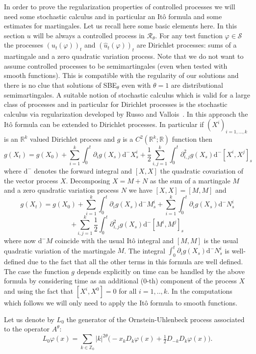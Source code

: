 \documentclass[11pt,a4paper,reqno]{amsart}
\newcommand{\RR}{\mathbb{R}}
\newcommand{\dd}{\mathrm{d}}
\newcommand{\cS}{\mathcal{S}}
\begin{document}
In order to prove the regularization properties of controlled processes we will need some stochastic calculus and in particular an It\^o formula and some estimates for martingales. Let us recall here some basic elements here. In this section $u$ will be always a controlled process in $\mathcal{R}_\theta$. 
For any test function $\varphi\in\cS$ the processes $(u_t(\varphi))_{t}$ and $(\hat u_t(\varphi))_{t}$ are Dirichlet processes: sums of a martingale and a zero quadratic variation process. 
Note that we do not want to assume controlled processes to be semimartingales (even when tested with smooth functions). This is compatible with the regularity of our solutions and there is no clue that solutions of  SBE$_\theta$ even with $\theta=1$ are distributional semimartingales. A suitable notion of stochastic calculus which is valid for a large class of processes and in particular for Dirichlet processes is the stochastic calculus via regularization developed by Russo and Vallois~\cite{RV}. In this approach the It\^o formula can be extended to Dirichlet processes. In particular if $(X^i)_{i=1,\dots,k}$ is an $\RR^k$ valued Dirichlet process and $g$ is a $C^2(\RR^k;\RR)$ function then
$$
g(X_t) = g(X_0) + \sum_{i=1}^k\int_0^t \partial_i g(X_s) \dd^- X^i_s + \frac12 \sum_{i,j=1}^k \int_0^t \partial^2_{i,j} g(X_s) \dd^- [X^i,X^j]_s
$$
where $\dd^-$ denotes the forward integral and $[X,X]$ the quadratic covariation of the vector process $X$. Decomposing $X=M+N$ as the sum of a martingale $M$ and a zero quadratic variation process $N$ we have $[X,X]=[M,M]$ and
$$
g(X_t) = g(X_0) +  \sum_{i=1}^k \int_0^t \partial_i g(X_s) \dd^- M^i_s +  \sum_{i=1}^k \int_0^t \partial_i g(X_s) \dd^- N^i_s
$$
$$ +   \sum_{i,j=1}^k\frac12 \int_0^t \partial^2_{i,j} g(X_s) \dd^- [M^i,M^j]_s
$$
where now $\dd^- M$ coincide with  the usual It\^o integral and $[M,M]$ is the usual quadratic variation of the martingale $M$. The integral $\int_0^t \partial_i g(X_s) \dd^- N^i_s$ is well-defined due to the fact that all the other terms in this formula are well defined. The case the function $g$ depends explicitly on time can be handled by the above formula by considering time as an additional (0-th) component of the process $X$ and using the fact that $[X^i,X^0]=0$ for all $i=1,..,k$. In the computations which follows we will only need to apply the It\^o formula to smooth functions.




Let us denote by $L_0$ the generator of the Ornstein-Uhlenbeck process associated to the operator $A^\theta$:
\begin{equation}
\label{eq:generator-ou}
L_0 \varphi(x) = \sum_{k \in \mathbb Z_0} |k|^{2\theta} \big(- x_k D_k \varphi(x) + \tfrac{1}{2} D_{-k}D_k \varphi(x)\big). 
\end{equation}
\end{document}

